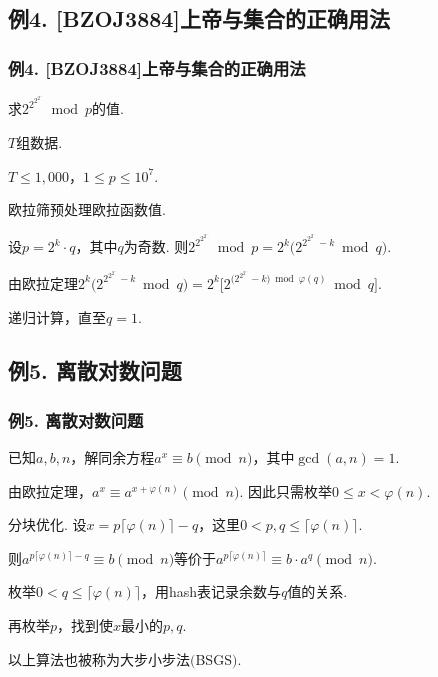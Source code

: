 \documentclass{beamer}
\def\leq{\leqslant}
\def\dou{，\!\!}
\begin{document}
    \subsection{例4. [BZOJ3884]上帝与集合的正确用法}

    \begin{frame}
        \frametitle{例4. [BZOJ3884]上帝与集合的正确用法}
        \begin{block}

            求$2^{2^{2^{2^{\cdots}}}}\bmod p$的值.\pause

            $T$组数据.\pause

            $T\leq 1,000$\dou $1\leq p\leq {10}^7$.\pause
        \end{block}

        欧拉筛预处理欧拉函数值.\pause

        设$p=2^k\cdot q$\dou 其中$q$为奇数. 则$2^{2^{2^{2^{\cdots}}}}\bmod p=2^k\bigg(2^{2^{2^{2^{\cdots}}}-k}\bmod q\bigg)$.\pause

        由欧拉定理$2^k\bigg(2^{2^{2^{2^{\cdots}}}-k}\bmod q\bigg)=2^k\bigg[2^{\big(2^{2^{2^{\cdots}}}-k\big)\bmod\varphi(q)}\bmod q\bigg]$.\pause

        递归计算\dou 直至$q=1$.
    \end{frame}

    \subsection{例5. 离散对数问题}

    \begin{frame}
        \frametitle{例5. 离散对数问题}
        \begin{block}

            已知$a,b,n$\dou 解同余方程$a^x\equiv b\pmod{n}$\dou 其中$\gcd(a,n)=1$.\pause
        \end{block}

        由欧拉定理\dou $a^x\equiv a^{x+\varphi(n)}\pmod{n}$. 因此只需枚举$0\leq x<\varphi(n)$.\pause
        
        分块优化. 设$x=p\big\lceil\varphi(n)\big\rceil-q$\dou 这里$0<p,q\leq\lceil\varphi(n)\big\rceil$.\pause

        则$a^{p\lceil\varphi(n)\rceil-q}\equiv b\pmod{n}$等价于$a^{p\lceil\varphi(n)\rceil}\equiv b\cdot a^q\pmod{n}$.\pause

        枚举$0<q\leq\lceil\varphi(n)\big\rceil$\dou 用hash表记录余数与$q$值的关系.\pause

        再枚举$p$\dou 找到使$x$最小的$p,q$.\pause

        以上算法也被称为大步小步法$($BSGS$)$.
    \end{frame}
\end{document}
